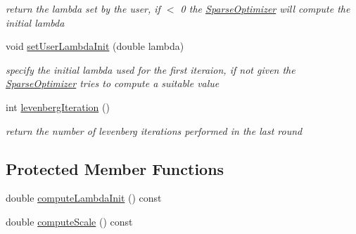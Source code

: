 \begin{DoxyCompactItemize}
\begin{DoxyCompactList}\small\item\em return the lambda set by the user, if $<$ 0 the \mbox{\hyperlink{classg2o_1_1_sparse_optimizer}{Sparse\+Optimizer}} will compute the initial lambda \end{DoxyCompactList}\item 
void \mbox{\hyperlink{classg2o_1_1_optimization_algorithm_levenberg_a9388e5e7800b18acb0db0a9a7be031a6}{set\+User\+Lambda\+Init}} (double lambda)
\begin{DoxyCompactList}\small\item\em specify the initial lambda used for the first iteraion, if not given the \mbox{\hyperlink{classg2o_1_1_sparse_optimizer}{Sparse\+Optimizer}} tries to compute a suitable value \end{DoxyCompactList}\item 
int \mbox{\hyperlink{classg2o_1_1_optimization_algorithm_levenberg_a6d458d8a89069fab92fab75c1255a523}{levenberg\+Iteration}} ()
\begin{DoxyCompactList}\small\item\em return the number of levenberg iterations performed in the last round \end{DoxyCompactList}\end{DoxyCompactItemize}
\subsection*{Protected Member Functions}
\begin{DoxyCompactItemize}
\item 
double \mbox{\hyperlink{classg2o_1_1_optimization_algorithm_levenberg_a2141aed034c5db8b2943aad5853b0cde}{compute\+Lambda\+Init}} () const
\item 
double \mbox{\hyperlink{classg2o_1_1_optimization_algorithm_levenberg_aa49f788d13c2ab6026ebaf36f887dc9a}{compute\+Scale}} () const
\end{DoxyCompactItemize}
